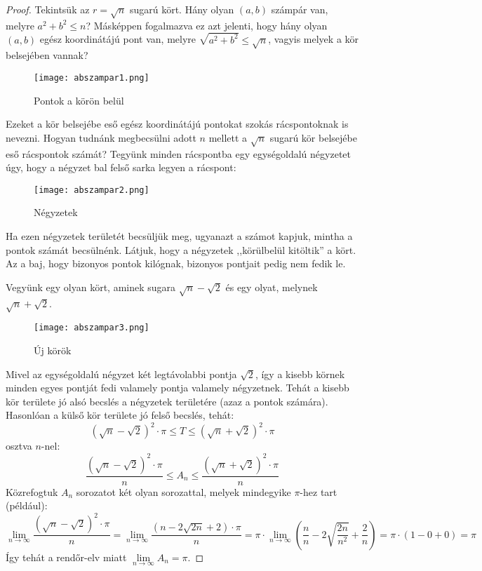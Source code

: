 \documentclass[12pt]{book}
\theoremstyle{plain} %
\theoremstyle{definition} %
\theoremstyle{remark}
\numberwithin{equation}{section}  %
\begin{document}
	\begin{proof}
		Tekintsük az $r=\sqrt{n}$ sugarú kört. Hány olyan $(a,b)$ számpár van, melyre $a^2+b^2\leq n$? Másképpen fogalmazva ez azt jelenti, hogy hány olyan $(a,b)$ egész koordinátájú pont van, melyre $\sqrt{a^2+b^2}\leq \sqrt{n}$, vagyis melyek a kör belsejében vannak?
		
		\begin{figure}[h] %
			\centering
			\texttt{[image: abszampar1.png]}
			\caption{Pontok a körön belül}\label{abszampar1}
		\end{figure}
	
		Ezeket a kör belsejébe eső egész koordinátájú pontokat szokás rácspontoknak is nevezni. Hogyan tudnánk megbecsülni adott $n$ mellett a $\sqrt{n}$ sugarú kör belsejébe eső rácspontok számát? Tegyünk minden rácspontba egy egységoldalú négyzetet úgy, hogy a négyzet bal felső sarka legyen a rácspont:
		
		\begin{figure}[h] %
			\centering
			\texttt{[image: abszampar2.png]}
			\caption{Négyzetek}\label{abszampar2}
		\end{figure}
		
		Ha ezen négyzetek területét becsüljük meg, ugyanazt a számot kapjuk, mintha a pontok számát becsülnénk. Látjuk, hogy a négyzetek ,,körülbelül kitöltik'' a kört. Az a baj, hogy bizonyos pontok kilógnak, bizonyos pontjait pedig nem fedik le.
		
		Vegyünk egy olyan kört, aminek sugara $\sqrt{n}-\sqrt{2}$ és egy olyat, melynek $\sqrt{n}+\sqrt{2}$.
		
		\begin{figure}[h] %
			\centering
			\texttt{[image: abszampar3.png]}
			\caption{Új körök}\label{abszampar3}
		\end{figure}
		
		Mivel az egységoldalú négyzet két legtávolabbi pontja $\sqrt{2}$, így a kisebb körnek minden egyes pontját fedi valamely pontja valamely négyzetnek. Tehát a kisebb kör területe jó alsó becslés a négyzetek területére (azaz a pontok számára). Hasonlóan a külső kör területe jó felső becslés, tehát:
		\[ (\sqrt{n}-\sqrt{2})^2\cdot \pi  \leq  T\leq  (\sqrt{n}+\sqrt{2})^2\cdot \pi  \]
		osztva $n$-nel:
		\[ \dfrac{(\sqrt{n}-\sqrt{2})^2\cdot \pi}{n} \leq A_n \leq  \dfrac{(\sqrt{n}+\sqrt{2})^2\cdot \pi}{n} \]
		Közrefogtuk $A_n$ sorozatot két olyan sorozattal, melyek mindegyike $\pi$-hez tart (például):
		\[ \lim\limits_{n\to\infty} \dfrac{(\sqrt{n}-\sqrt{2})^2\cdot \pi}{n} = \lim\limits_{n\to\infty} \dfrac{(n-2\sqrt{2n}+2)\cdot \pi}{n} = \pi\cdot  \lim\limits_{n\to\infty} \left( \dfrac{n}{n} -2 \sqrt{\dfrac{2n}{n^2}} + \dfrac{2}{n} \right) = \pi \cdot (1-0+0) = \pi  \]
		Így tehát a rendőr-elv miatt $\lim\limits_{n\to \infty} A_n = \pi$.
	\end{proof}
\end{document}
